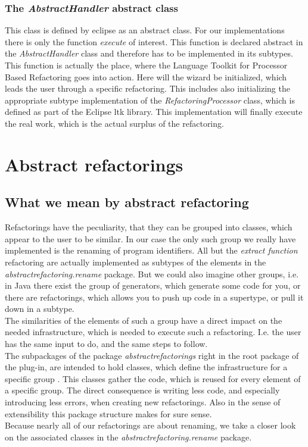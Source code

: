 \documentclass[a4paper,10pt]{report}
\begin{document}
\subsection{The {\it AbstractHandler} abstract class}
This class is defined by eclipse as an abstract class. For our implementations there is only the function {\it execute} of interest.
This function is declared abstract in the {\it AbstractHandler} class and therefore has to be implemented in its subtypes.\\
This function is actually the place, where the Language Toolkit for Processor Based Refactoring goes into action.
Here will the wizard be initialized, which leads the user through a specific refactoring.
This includes also initializing the appropriate subtype implementation of the {\it RefactoringProcessor} class, which is defined as part of the Eclipse ltk library. 
This implementation will finally execute the real work, which is the actual surplus of the refactoring.

\chapter{Abstract refactorings}
\label{abstractRefactorings}
\section{What we mean by abstract refactoring}
Refactorings have the peculiarity, that they can be grouped into classes, which appear to the user to be similar.
In our case the only such group we really have implemented is the renaming of program identifiers.
All but the {\it extract function} refactoring are actually implemented as subtypes of the elements in the {\it abstractrefactoring.rename} package.
But we could also imagine other groups, i.e. in Java there exist the group of generators, which generate some code for you, or there are refactorings,
which allows you to push up code in a supertype, or pull it down in a subtype.\\
The similarities of the elements of such a group have a direct impact on the needed infrastructure, which is needed to execute such a refactoring.
I.e. the user has the same input to do, and the same steps to follow.\\
The subpackages of the package {\it abstractrefactorings} right in the root package of the plug-in, are intended to hold classes,
which define the infrastructure for a specific group . This classes gather the code, which is reused for every element of a specific group.
The direct consequence is writing less code, and especially introducing less errors, when creating new refactorings.
Also in the sense of extensibility this package structure makes for sure sense.\\
Because nearly all of our refactorings are about renaming, we take a closer look on the associated classes in the {\it abstractrefactoring.rename} package.
\end{document}
